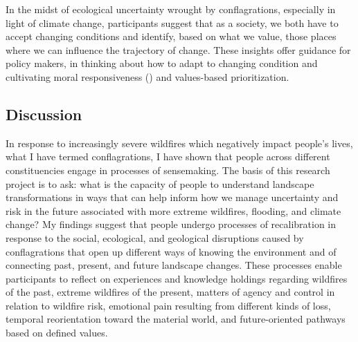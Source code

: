 \documentclass[
]{article}
\begin{document}
In the midst of ecological uncertainty wrought by conflagrations, especially in light of climate change, participants suggest that as a society, we both have to accept changing conditions and identify, based on what we value, those places where we can influence the trajectory of change. These insights offer guidance for policy makers, in thinking about how to adapt to changing condition and cultivating moral responsiveness () and values-based prioritization.

\subsection{Discussion}\label{discussion-2}

In response to increasingly severe wildfires which negatively impact people's lives, what I have termed conflagrations, I have shown that people across different constituencies engage in processes of sensemaking. The basis of this research project is to ask: what is the capacity of people to understand landscape transformations in ways that can help inform how we manage uncertainty and risk in the future associated with more extreme wildfires, flooding, and climate change? My findings suggest that people undergo processes of recalibration in response to the social, ecological, and geological disruptions caused by conflagrations that open up different ways of knowing the environment and of connecting past, present, and future landscape changes. These processes enable participants to reflect on experiences and knowledge holdings regarding wildfires of the past, extreme wildfires of the present, matters of agency and control in relation to wildfire risk, emotional pain resulting from different kinds of loss, temporal reorientation toward the material world, and future-oriented pathways based on defined values.
\end{document}
